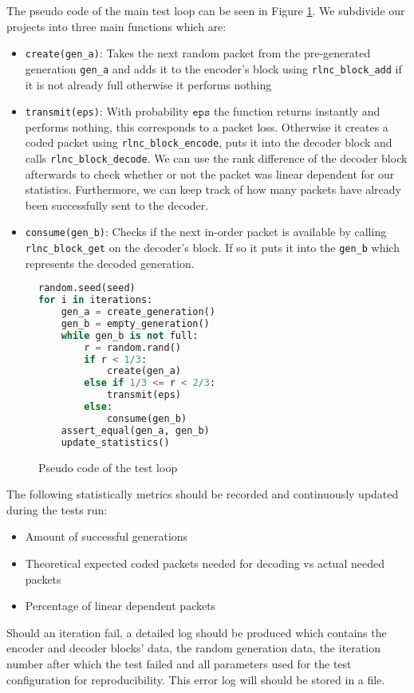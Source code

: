\documentclass[a4paper,english,10pt]{tumarticle}
\begin{document}
The pseudo code of the main test loop can be seen in Figure \ref{code}. We subdivide our projects into three main functions which are:

\begin{itemize}
    \setlength{\itemsep}{1pt}
	\setlength{\parskip}{0pt}
	\setlength{\parsep}{0pt}
    \item \texttt{create(gen\_a)}: Takes the next random packet from the pre-generated generation \texttt{gen\_a} and adds it to the encoder's block using \texttt{rlnc\_block\_add} if it is not already full otherwise it performs nothing
    \item \texttt{transmit(eps)}: With probability $\texttt{eps}$ the function returns instantly and performs nothing, this corresponds to a packet loss. Otherwise it creates a coded packet using \texttt{rlnc\_block\_encode}, puts it into the decoder block and calls \texttt{rlnc\_block\_decode}. We can use the rank difference of the decoder block afterwards to check whether or not the packet was linear dependent for our statistics. Furthermore, we can keep track of how many packets have already been successfully sent to the decoder.
    \item \texttt{consume(gen\_b)}: Checks if the next in-order packet is available by calling \texttt{rlnc\_block\_get} on the decoder's block. If so it puts it into the \texttt{gen\_b} which represents the decoded generation.
\end{itemize}


\begin{figure}[h]
  \begin{lstlisting}[language=Python]
random.seed(seed)
for i in iterations:
    gen_a = create_generation()
    gen_b = empty_generation()
    while gen_b is not full:
        r = random.rand()
        if r < 1/3:
            create(gen_a)
        else if 1/3 <= r < 2/3:
            transmit(eps)
        else:
            consume(gen_b)
    assert_equal(gen_a, gen_b)
    update_statistics()
\end{lstlisting}
  \caption[]{Pseudo code of the test loop}
  \label{code}
\end{figure}

The following statistically metrics should be recorded and continuously updated during the tests run:
\begin{itemize}
    \setlength{\itemsep}{1pt}
	\setlength{\parskip}{0pt}
	\setlength{\parsep}{0pt}
    \item Amount of successful generations
    \item Theoretical expected coded packets needed for decoding vs actual needed packets
    \item Percentage of linear dependent packets
\end{itemize}
Should an iteration fail, a detailed log should be produced which contains the encoder and decoder blocks' data, the random generation data, the iteration number after which the test failed and all parameters used
for the test configuration for reproducibility. This error log will should be stored in a file.
\end{document}
